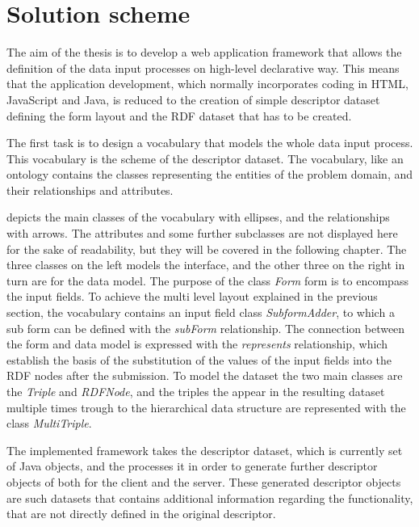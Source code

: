 \section{Solution scheme}

The aim of the thesis is to develop a web application framework that allows the definition of the data input processes on high-level declarative way. This means that the application development, which normally incorporates coding in HTML, JavaScript and Java, is reduced to the creation of simple descriptor dataset defining the form layout and the RDF dataset that has to be created.

The first task is to design a vocabulary that models the whole data input process. This vocabulary is the scheme of the descriptor dataset. The vocabulary, like an ontology contains the classes representing the entities of the problem domain, and their relationships and attributes.


 depicts the main classes of the vocabulary with ellipses, and the relationships with arrows. The attributes and some further subclasses are not displayed here for the sake of readability, but they will be covered in the following chapter. The three classes on the left models the interface, and the other three on the right in turn are for the data model. The purpose of the class \textit{Form} form is to encompass the input fields. To achieve the multi level layout explained in the previous section, the vocabulary contains an input field class \textit{SubformAdder}, to which a sub form can be defined with the \textit{subForm} relationship. The connection between the form and data model is expressed with the \textit{represents} relationship, which establish the basis of the substitution of the values of the input fields into the RDF nodes after the submission. To model the dataset the two main classes are the \textit{Triple} and \textit{RDFNode}, and the triples the appear in the resulting dataset multiple times trough to the hierarchical data structure are represented with the class \textit{MultiTriple}. 

The implemented framework takes the descriptor dataset, which is currently set of Java objects, and the processes it in order to generate further descriptor objects of both for the client and the server. These generated descriptor objects are such datasets that contains additional information regarding the functionality, that are not directly defined in the original descriptor. 

